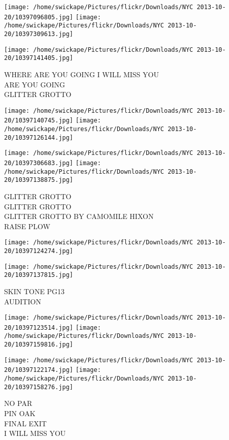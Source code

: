 \documentclass[10pt,letterpaper]{article}
\begin{document}
\texttt{[image: /home/swickape/Pictures/flickr/Downloads/NYC 2013-10-20/10397096805.jpg]}
\texttt{[image: /home/swickape/Pictures/flickr/Downloads/NYC 2013-10-20/10397309613.jpg]}

\vspace{0.25in}
\texttt{[image: /home/swickape/Pictures/flickr/Downloads/NYC 2013-10-20/10397141405.jpg]}

WHERE ARE YOU GOING I WILL MISS YOU\\
ARE YOU GOING\\
GLITTER GROTTO\\
\pagebreak

\texttt{[image: /home/swickape/Pictures/flickr/Downloads/NYC 2013-10-20/10397140745.jpg]}
\texttt{[image: /home/swickape/Pictures/flickr/Downloads/NYC 2013-10-20/10397126144.jpg]}

\texttt{[image: /home/swickape/Pictures/flickr/Downloads/NYC 2013-10-20/10397306683.jpg]}
\texttt{[image: /home/swickape/Pictures/flickr/Downloads/NYC 2013-10-20/10397138875.jpg]}

GLITTER GROTTO\\
GLITTER GROTTO\\
GLITTER GROTTO BY CAMOMILE HIXON\\
RAISE PLOW\\
\pagebreak

\texttt{[image: /home/swickape/Pictures/flickr/Downloads/NYC 2013-10-20/10397124274.jpg]}

\vspace{0.25in}
\texttt{[image: /home/swickape/Pictures/flickr/Downloads/NYC 2013-10-20/10397137815.jpg]}

SKIN TONE PG13\\
AUDITION\\
\pagebreak

\texttt{[image: /home/swickape/Pictures/flickr/Downloads/NYC 2013-10-20/10397123514.jpg]}
\texttt{[image: /home/swickape/Pictures/flickr/Downloads/NYC 2013-10-20/10397159816.jpg]}

\texttt{[image: /home/swickape/Pictures/flickr/Downloads/NYC 2013-10-20/10397122174.jpg]}
\texttt{[image: /home/swickape/Pictures/flickr/Downloads/NYC 2013-10-20/10397158276.jpg]}

NO PAR\\
PIN OAK\\
FINAL EXIT\\
I WILL MISS YOU\\
\pagebreak
\end{document}
